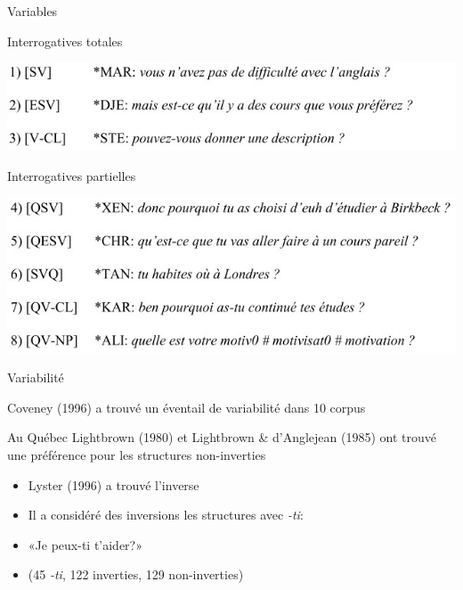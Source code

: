 \documentclass{beamer}
\begin{document}
    \begin{frame}{Variables}
      \begin{block}{}
        Interrogatives totales
      \end{block}
      \includegraphics[scale=0.5]{interrogatives_totales.jpg}
      \begin{block}{}
        Interrogatives partielles
      \end{block}
      \includegraphics[scale=0.5]{interrogatives_partielles.jpg}
    \end{frame}

    \begin{frame}{Variabilité}
      \begin{block}{}
        Coveney (1996) a trouvé un éventail de variabilité dans 10 corpus
      \end{block}
      \begin{block}{Au Québec}
        Lightbrown (1980) et Lightbrown \& d'Anglejean (1985) ont trouvé une préférence pour les structures non-inverties
        \begin{itemize}
          \item Lyster (1996) a trouvé l'inverse
          \item Il a considéré des inversions les structures avec \emph{-ti}:
          \item «Je peux-ti t'aider?»
          \item (45 \emph{-ti}, 122 inverties, 129 non-inverties)
        \end{itemize}
      \end{block}
    \end{frame}
\end{document}
